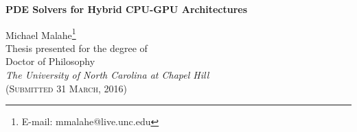 


\begin{titlepage}

\begin{center}

\LARGE{\textbf{PDE Solvers for Hybrid CPU-GPU Architectures}}\\

\vspace{2.5cm}

\LARGE{Michael Malahe}\footnote{E-mail: mmalahe@live.unc.edu}\\
\vspace{1cm}
\vspace{1cm}
Thesis presented for the degree of\\
Doctor of Philosophy\\
\textit{\normalsize{The University of North Carolina at Chapel Hill}}
\\
\textsc{\small{(Submitted 31 March, 2016)}}\\ %

\end{center}
\end{titlepage}
